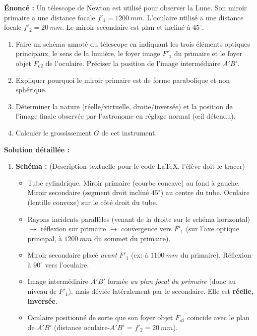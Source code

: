 \documentclass[11pt]{article}
\begin{document}
\begin{exoresolu}
\textbf{Énoncé :} Un télescope de Newton est utilisé pour observer la Lune. Son miroir primaire a une distance focale $f'_1 = \SI{1200}{mm}$. L'oculaire utilisé a une distance focale $f'_2 = \SI{20}{mm}$. Le miroir secondaire est plan et incliné à $45^\circ$.
\begin{enumerate}
    \item Faire un schéma annoté du télescope en indiquant les trois éléments optiques principaux, le sens de la lumière, le foyer image $F'_1$ du primaire et le foyer objet $F_{o2}$ de l'oculaire. Préciser la position de l'image intermédiaire $A'B'$.
    \item Expliquer pourquoi le miroir primaire est de forme parabolique et non sphérique.
    \item Déterminer la nature (réelle/virtuelle, droite/inversée) et la position de l'image finale observée par l'astronome en réglage normal (œil détendu).
    \item Calculer le grossissement $G$ de cet instrument.
\end{enumerate}
\tcblower
\textbf{Solution détaillée :}
\begin{enumerate}
    \item \textbf{Schéma :} (Description textuelle pour le code \LaTeX, l'élève doit le tracer)
    \begin{itemize}
        \item Tube cylindrique. Miroir primaire (courbe concave) au fond à gauche. Miroir secondaire (segment droit incliné $45^\circ$) au centre du tube. Oculaire (lentille convexe) sur le côté droit du tube.
        \item Rayons incidents parallèles (venant de la droite sur le schéma horizontal) $\rightarrow$ réflexion sur primaire $\rightarrow$ convergence vers $F'_1$ (sur l'axe optique principal, à $\SI{1200}{mm}$ du sommet du primaire).
        \item Miroir secondaire placé \emph{avant} $F'_1$ (ex: à $\SI{1100}{mm}$ du primaire). Réflexion à $90^\circ$ vers l'oculaire.
        \item Image intermédiaire $A'B'$ formée \emph{au plan focal du primaire} (donc au niveau de $F'_1$), mais déviée latéralement par le secondaire. Elle est \textbf{réelle, inversée}.
        \item Oculaire positionné de sorte que son foyer objet $F_{o2}$ coïncide avec le plan de $A'B'$ (distance oculaire-$A'B'$ = $f'_2 = \SI{20}{mm}$).

\end{itemize}
\end{enumerate}
\end{exoresolu}
\end{document}
